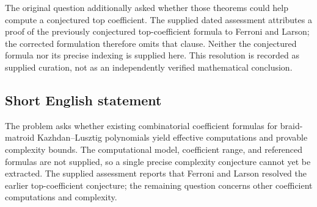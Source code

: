 \documentclass[11pt]{article}
\begin{document}
The original question additionally asked whether those theorems could help compute a conjectured top coefficient. The supplied dated assessment attributes a proof of the previously conjectured top-coefficient formula to Ferroni and Larson; the corrected formulation therefore omits that clause. Neither the conjectured formula nor its precise indexing is supplied here. This resolution is recorded as supplied curation, not as an independently verified mathematical conclusion.
\subsection{Short English statement}
The problem asks whether existing combinatorial coefficient formulas for braid-matroid Kazhdan--Lusztig polynomials yield effective computations and provable complexity bounds. The computational model, coefficient range, and referenced formulas are not supplied, so a single precise complexity conjecture cannot yet be extracted. The supplied assessment reports that Ferroni and Larson resolved the earlier top-coefficient conjecture; the remaining question concerns other coefficient computations and complexity.
\end{document}
